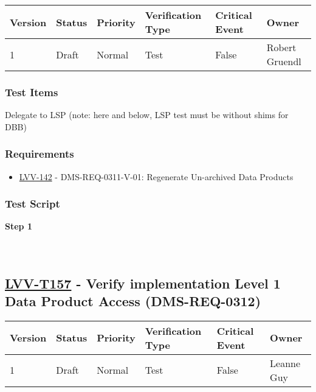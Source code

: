 \begin{longtable}[]{@{}llllll@{}}
\toprule
Version & Status & Priority & Verification Type & Critical Event &
Owner\tabularnewline
\midrule
\endhead
1 & Draft & Normal & Test & False & Robert Gruendl\tabularnewline
\bottomrule
\end{longtable}

\hypertarget{test-items-56}{%
\subsubsection{Test Items}\label{test-items-56}}

Delegate to LSP (note: here and below, LSP test must be without shims
for DBB)

\hypertarget{requirements-56}{%
\subsubsection{Requirements}\label{requirements-56}}

\begin{itemize}
\tightlist
\item
  \href{https://jira.lsstcorp.org/browse/LVV-142}{LVV-142} -
  DMS-REQ-0311-V-01: Regenerate Un-archived Data Products
\end{itemize}

\hypertarget{test-script-56}{%
\subsubsection{Test Script}\label{test-script-56}}

\textbf{Step 1}\\
~\\
~\\

\hypertarget{lvv-t157---verify-implementation-level-1-data-product-access-dms-req-0312}{%
\subsection{\texorpdfstring{\href{https://jira.lsstcorp.org/secure/Tests.jspa\#/testCase/LVV-T157}{LVV-T157}
- Verify implementation Level 1 Data Product Access
(DMS-REQ-0312)}{LVV-T157 - Verify implementation Level 1 Data Product Access (DMS-REQ-0312)}}\label{lvv-t157---verify-implementation-level-1-data-product-access-dms-req-0312}}

\begin{longtable}[]{@{}llllll@{}}
\toprule
Version & Status & Priority & Verification Type & Critical Event &
Owner\tabularnewline
\midrule
\endhead
1 & Draft & Normal & Test & False & Leanne Guy\tabularnewline
\bottomrule
\end{longtable}

